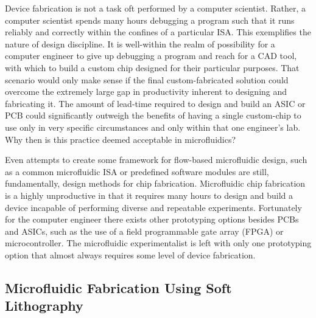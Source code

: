 Device fabrication is not a task oft performed by a computer scientist. Rather, a computer scientist spends many hours debugging a program such that it runs reliably and correctly within the confines of a particular ISA. This exemplifies the nature of design discipline. It is well-within the realm of possibility for a computer engineer to give up debugging a program and reach for a CAD tool, with which to build a custom chip designed for their particular purposes. That scenario would only make sense if the final custom-fabricated solution could overcome the extremely large gap in productivity inherent to designing and fabricating it. The amount of lead-time required to design and build an ASIC or PCB could significantly outweigh the benefits of having a single custom-chip to use only in very specific circumstances and only within that one engineer's lab. Why then is this practice deemed acceptable in microfluidics?

Even attempts to create some framework for flow-based microfluidic design, such as a common microfluidic ISA\cite{amin2009} or predefined software modules \cite{soe2013} are still, fundamentally, design methods for chip fabrication. Microfluidic chip fabrication is a highly unproductive in that it requires many hours to design and build a device incapable of performing diverse and repeatable experiments. Fortunately for the computer engineer there exists other prototyping options besides PCBs and ASICs, such as the use of a field programmable gate array (FPGA) or microcontroller. The microfluidic experimentalist is left with only one prototyping option that almost always requires some level of device
fabrication.


\subsection{Microfluidic Fabrication Using Soft Lithography}

